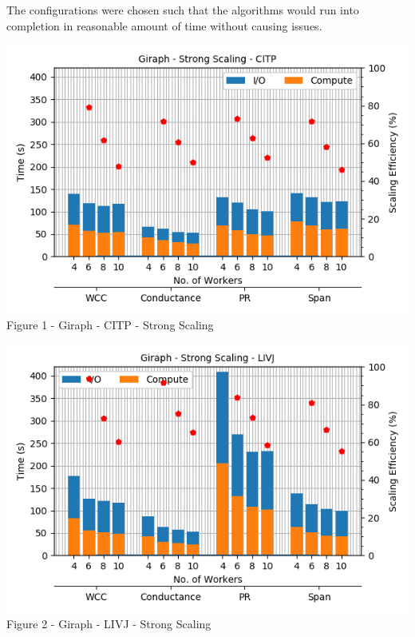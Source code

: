 \documentclass[11pt,a4paper,oneside]{article}
\begin{document}
    The configurations were chosen such that the algorithms would run into completion in reasonable amount of time without causing issues.
    
    \begin{center}
    	\includegraphics[scale=0.5]{1.png} \\	
    	Figure 1 - Giraph - CITP - Strong Scaling	
    \end{center}

    \begin{center}
    	\includegraphics[scale=0.5]{2.png} \\
    	Figure 2 - Giraph - LIVJ - Strong Scaling		
    \end{center}
\end{document}
